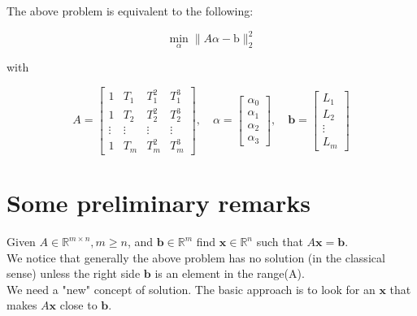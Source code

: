 \documentclass[11pt]{book}
\begin{document}
The above problem is equivalent to the following:

$$
\min _{\alpha}\|A \alpha-\mathrm{b}\|_{2}^{2}
$$

with

$$
A=\left[\begin{array}{cccc}
1 & T_{1} & T_{1}^{2} & T_{1}^{3} \\
1 & T_{2} & T_{2}^{2} & T_{2}^{3} \\
\vdots & \vdots & \vdots & \vdots \\
1 & T_{m} & T_{m}^{2} & T_{m}^{3}
\end{array}\right], \quad \alpha=\left[\begin{array}{c}
\alpha_{0} \\
\alpha_{1} \\
\alpha_{2} \\
\alpha_{3}
\end{array}\right], \quad \mathbf{b}=\left[\begin{array}{c}
L_{1} \\
L_{2} \\
\vdots \\
L_{m}
\end{array}\right]
$$


\section*{Some preliminary remarks}
Given $A \in \mathbb{R}^{m \times n}, m \geq n$, and $\mathbf{b} \in \mathbb{R}^{m}$ find $\mathbf{x} \in \mathbb{R}^{n}$ such that $A \mathbf{x}=\mathbf{b}$.\\
We notice that generally the above problem has no solution (in the classical sense) unless the right side $\mathbf{b}$ is an element in the range(A).\\
We need a "new" concept of solution. The basic approach is to look for an $\mathbf{x}$ that makes $A\mathbf{x}$ close to $\mathbf{b}$.
\end{document}
